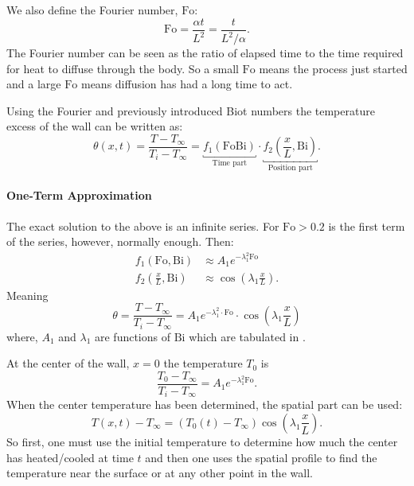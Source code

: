 We also define the Fourier number, $\mathrm{Fo}$:
\begin{equation*}
  \mathrm{Fo} = \frac{\alpha t}{L^2} = \frac{t}{L^2 / \alpha}
.\end{equation*}
The Fourier number can be seen as the ratio of elapsed time to the time required for heat to diffuse through the body.
So a small $\mathrm{Fo}$ means the process just started and a large $\mathrm{Fo}$ means diffusion has had a long time to act.

Using the Fourier and previously introduced Biot numbers the temperature excess of the wall can be written as:
\begin{equation*}
  \theta(x,t) = \frac{T - T_{\infty}}{T_i - T_{\infty}} = \underbracket{f_1 (\mathrm{Fo} \mathrm{Bi})}_{\text{Time part}} \cdot \underbracket{f_2 \left( \frac{x}{L}, \mathrm{Bi} \right)}_{\text{Position part}}
.\end{equation*}


\paragraph{One-Term Approximation}
The exact solution to the above is an infinite series.
For $\mathrm{Fo} > \num{0,2}$ is the first term of the series, however, normally enough.
Then:
\begin{align*}
  f_1(\mathrm{Fo}, \mathrm{Bi}) &\approx A_1 e^{-\lambda_1^2 \mathrm{Fo}} \\
  f_2 \left( \frac{x}{L}, \mathrm{Bi} \right) &\approx \cos \left( \lambda_1 \frac{x}{L} \right)
.\end{align*}
Meaning
\begin{equation*}
  \theta = \frac{T - T_{\infty}}{T_i - T_{\infty}} = A_1 e^{-\lambda_1^2 \cdot \mathrm{Fo}} \cdot \cos \left( \lambda_1 \frac{x}{L} \right)
\end{equation*}
where, $A_1$ and $\lambda_1$ are functions of $\mathrm{Bi}$ which are tabulated in .

At the center of the wall, $x = 0$ the temperature $T_0$ is
\begin{equation*}
  \frac{T_0 - T_{\infty}}{T_i - T_{\infty}} = A_1 e^{-\lambda_1^2 \mathrm{Fo}}
.\end{equation*}
When the center temperature has been determined, the spatial part can be used:
\begin{equation*}
  T(x,t) - T_{\infty} = \left( T_0 (t) - T_{\infty} \right) \cos \left( \lambda_1 \frac{x}{L} \right)
.\end{equation*}
So first, one must use the initial temperature to determine how much the center has heated/cooled at time $t$ and then one uses the spatial profile to find the temperature near the surface or at any other point in the wall.

